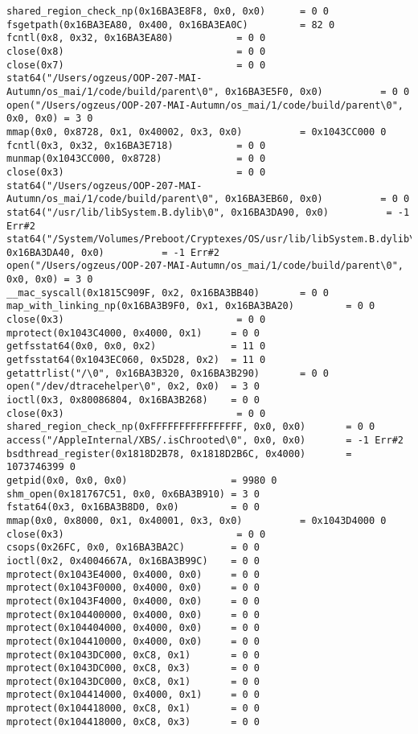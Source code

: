 \begin{lstlisting}
shared_region_check_np(0x16BA3E8F8, 0x0, 0x0)      = 0 0
fsgetpath(0x16BA3EA80, 0x400, 0x16BA3EA0C)         = 82 0
fcntl(0x8, 0x32, 0x16BA3EA80)           = 0 0
close(0x8)                              = 0 0
close(0x7)                              = 0 0
stat64("/Users/ogzeus/OOP-207-MAI-Autumn/os_mai/1/code/build/parent\0", 0x16BA3E5F0, 0x0)          = 0 0
open("/Users/ogzeus/OOP-207-MAI-Autumn/os_mai/1/code/build/parent\0", 0x0, 0x0) = 3 0
mmap(0x0, 0x8728, 0x1, 0x40002, 0x3, 0x0)          = 0x1043CC000 0
fcntl(0x3, 0x32, 0x16BA3E718)           = 0 0
munmap(0x1043CC000, 0x8728)             = 0 0
close(0x3)                              = 0 0
stat64("/Users/ogzeus/OOP-207-MAI-Autumn/os_mai/1/code/build/parent\0", 0x16BA3EB60, 0x0)          = 0 0
stat64("/usr/lib/libSystem.B.dylib\0", 0x16BA3DA90, 0x0)          = -1 Err#2
stat64("/System/Volumes/Preboot/Cryptexes/OS/usr/lib/libSystem.B.dylib\0", 0x16BA3DA40, 0x0)          = -1 Err#2
open("/Users/ogzeus/OOP-207-MAI-Autumn/os_mai/1/code/build/parent\0", 0x0, 0x0) = 3 0
__mac_syscall(0x1815C909F, 0x2, 0x16BA3BB40)       = 0 0
map_with_linking_np(0x16BA3B9F0, 0x1, 0x16BA3BA20)         = 0 0
close(0x3)                              = 0 0
mprotect(0x1043C4000, 0x4000, 0x1)     = 0 0
getfsstat64(0x0, 0x0, 0x2)             = 11 0
getfsstat64(0x1043EC060, 0x5D28, 0x2)  = 11 0
getattrlist("/\0", 0x16BA3B320, 0x16BA3B290)       = 0 0
open("/dev/dtracehelper\0", 0x2, 0x0)  = 3 0
ioctl(0x3, 0x80086804, 0x16BA3B268)    = 0 0
close(0x3)                              = 0 0
shared_region_check_np(0xFFFFFFFFFFFFFFFF, 0x0, 0x0)       = 0 0
access("/AppleInternal/XBS/.isChrooted\0", 0x0, 0x0)       = -1 Err#2
bsdthread_register(0x1818D2B78, 0x1818D2B6C, 0x4000)       = 1073746399 0
getpid(0x0, 0x0, 0x0)                  = 9980 0
shm_open(0x181767C51, 0x0, 0x6BA3B910) = 3 0
fstat64(0x3, 0x16BA3B8D0, 0x0)         = 0 0
mmap(0x0, 0x8000, 0x1, 0x40001, 0x3, 0x0)          = 0x1043D4000 0
close(0x3)                              = 0 0
csops(0x26FC, 0x0, 0x16BA3BA2C)        = 0 0
ioctl(0x2, 0x4004667A, 0x16BA3B99C)    = 0 0
mprotect(0x1043E4000, 0x4000, 0x0)     = 0 0
mprotect(0x1043F0000, 0x4000, 0x0)     = 0 0
mprotect(0x1043F4000, 0x4000, 0x0)     = 0 0
mprotect(0x104400000, 0x4000, 0x0)     = 0 0
mprotect(0x104404000, 0x4000, 0x0)     = 0 0
mprotect(0x104410000, 0x4000, 0x0)     = 0 0
mprotect(0x1043DC000, 0xC8, 0x1)       = 0 0
mprotect(0x1043DC000, 0xC8, 0x3)       = 0 0
mprotect(0x1043DC000, 0xC8, 0x1)       = 0 0
mprotect(0x104414000, 0x4000, 0x1)     = 0 0
mprotect(0x104418000, 0xC8, 0x1)       = 0 0
mprotect(0x104418000, 0xC8, 0x3)       = 0 0

\end{lstlisting}
